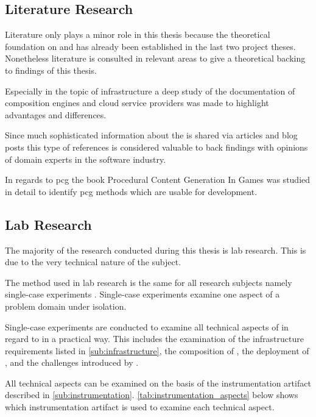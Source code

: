 \subsection{Literature Research}

Literature only plays a minor role in this thesis because the theoretical
foundation on \mss{} and \ogs{} has already been established in the last two
project theses. Nonetheless literature is consulted in relevant areas to give
a theoretical backing to findings of this thesis.

Especially in the topic of \ms{} infrastructure a deep study of the
documentation of composition engines and cloud service providers was made
to highlight advantages and differences.

Since much sophisticated information about the \mss{} is shared via articles
and blog posts this type of references is considered valuable to back findings
with opinions of domain experts in the software industry.

In regards to \gls{pcg} the book Procedural Content Generation In
Games \cite{shaker2014procedural} was studied in detail to identify \gls{pcg}
methods which are usable for \og{} development.

\subsection{Lab Research}
\label{sub:lab_reserach}

The majority of the research conducted during this thesis is lab research. This
is due to the very technical nature of the subject. 

The method used in lab research is the same for all research subjects namely
single-case experiments \cite{wieringa2014design_science}. Single-case
experiments examine one aspect of a problem domain under isolation.

Single-case experiments are conducted to examine all technical aspects of \mss{}
in regard to \ogs{} in a practical way. This includes the examination of the
\ms{} infrastructure requirements listed in \autoref{sub:infrastructure}, the
composition of \mss{}, the deployment of \mss{}, and the challenges introduced
by \mss{}.

All technical aspects can be examined on the basis of the instrumentation
artifact described in \autoref{sub:instrumentation}.
\autoref{tab:instrumentation_aspects} below shows which instrumentation artifact
is used to examine each technical aspect.

